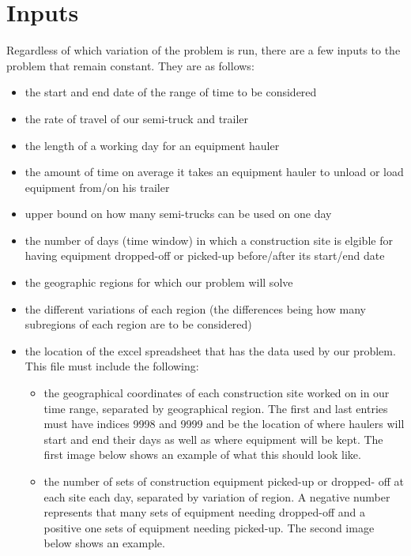 \documentclass[letterpaper,10pt,english]{sphinxmanual}
\begin{document}
\section{Inputs}
\label{\detokenize{main:inputs}}
Regardless of which variation of the problem is run, there are a few inputs
to the problem that remain constant. They are as follows:
\begin{itemize}
\item {} 
the start and end date of the range of time to be considered

\item {} 
the rate of travel of our semi-truck and trailer

\item {} 
the length of a working day for an equipment hauler

\item {} 
the amount of time on average it takes an equipment hauler to unload
or load equipment from/on his trailer

\item {} 
upper bound on how many semi-trucks can be used on one day

\item {} 
the number of days (time window) in which a construction site is
elgible for having equipment dropped-off or picked-up before/after
its start/end date

\item {} 
the geographic regions for which our problem will solve

\item {} 
the different variations of each region (the differences being how
many subregions of each region are to be considered)

\item {} 
the location of the excel spreadsheet that has the data used by our
problem. This file must include the following:
\begin{itemize}
\item {} 
the geographical coordinates of each construction site worked on
in our time range, separated by geographical region. The first and
last entries must have indices 9998 and 9999 and be the location of
where haulers will start and end their days as well as where
equipment will be kept. The first image below shows an example of
what this should look like.

\item {} 
the number of sets of construction equipment picked-up or dropped-
off at each site each day, separated by variation of region. A
negative number represents that many sets of equipment needing
dropped-off and a positive one sets of equipment needing picked-up.
The second image below shows an example.

\end{itemize}

\end{itemize}
\end{document}
